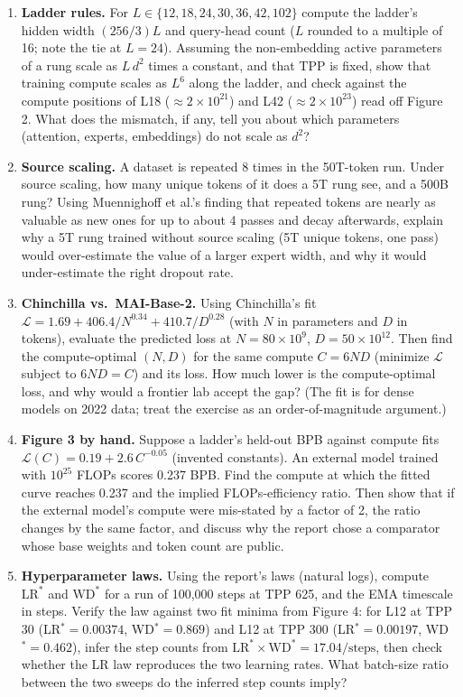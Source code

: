 \documentclass[11pt,letterpaper]{article}
\begin{document}
\begin{enumerate}[leftmargin=1.6em,itemsep=6pt]
\item \textbf{Ladder rules.} For $L\in\{12,18,24,30,36,42,102\}$ compute the ladder's hidden width $(256/3)L$ and query-head count ($L$ rounded to a multiple of 16; note the tie at $L=24$). Assuming the non-embedding active parameters of a rung scale as $L\,d^{2}$ times a constant, and that TPP is fixed, show that training compute scales as $L^{6}$ along the ladder, and check against the compute positions of L18 ($\approx2\times10^{21}$) and L42 ($\approx2\times10^{23}$) read off Figure 2. What does the mismatch, if any, tell you about which parameters (attention, experts, embeddings) do not scale as $d^2$?
\item \textbf{Source scaling.} A dataset is repeated 8 times in the 50T-token run. Under source scaling, how many unique tokens of it does a 5T rung see, and a 500B rung? Using Muennighoff et al.'s finding that repeated tokens are nearly as valuable as new ones for up to about 4 passes and decay afterwards, explain why a 5T rung trained without source scaling (5T unique tokens, one pass) would over-estimate the value of a larger expert width, and why it would under-estimate the right dropout rate.
\item \textbf{Chinchilla vs.\ MAI-Base-2.} Using Chinchilla's fit $\mathcal{L}=1.69+406.4/N^{0.34}+410.7/D^{0.28}$ (with $N$ in parameters and $D$ in tokens), evaluate the predicted loss at $N=80\times10^{9}$, $D=50\times10^{12}$. Then find the compute-optimal $(N,D)$ for the same compute $C=6ND$ (minimize $\mathcal{L}$ subject to $6ND=C$) and its loss. How much lower is the compute-optimal loss, and why would a frontier lab accept the gap? (The fit is for dense models on 2022 data; treat the exercise as an order-of-magnitude argument.)
\item \textbf{Figure 3 by hand.} Suppose a ladder's held-out BPB against compute fits $\mathcal{L}(C)=0.19+2.6\,C^{-0.05}$ (invented constants). An external model trained with $10^{25}$ FLOPs scores 0.237 BPB. Find the compute at which the fitted curve reaches 0.237 and the implied FLOPs-efficiency ratio. Then show that if the external model's compute were mis-stated by a factor of 2, the ratio changes by the same factor, and discuss why the report chose a comparator whose base weights and token count are public.
\item \textbf{Hyperparameter laws.} Using the report's laws (natural logs), compute $\text{LR}^*$ and $\text{WD}^*$ for a run of 100,000 steps at TPP 625, and the EMA timescale in steps. Verify the law against two fit minima from Figure 4: for L12 at TPP 30 (LR$^*=0.00374$, WD$^*=0.869$) and L12 at TPP 300 (LR$^*=0.00197$, WD$^*=0.462$), infer the step counts from $\text{LR}^*\times\text{WD}^*=17.04/\text{steps}$, then check whether the LR law reproduces the two learning rates. What batch-size ratio between the two sweeps do the inferred step counts imply?

\end{enumerate}
\end{document}
